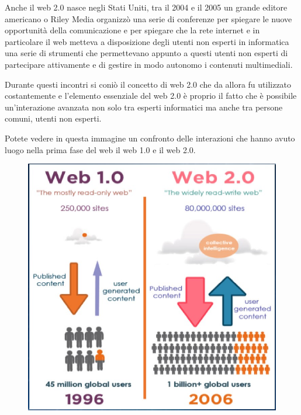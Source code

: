 Anche il web 2.0 nasce negli Stati Uniti, tra il 2004 e il 2005 un grande editore americano o Riley Media organizzò una serie di conferenze per spiegare le nuove opportunità della comunicazione e per spiegare che la rete internet e in particolare il web metteva a disposizione degli utenti non esperti in informatica una serie di strumenti che permettevano appunto a questi utenti non esperti di partecipare attivamente e di gestire in modo autonomo i contenuti multimediali. \par
Durante questi incontri si coniò il concetto di web 2.0 che da allora fu utilizzato costantemente e l'elemento essenziale del web 2.0 è proprio il fatto che è possibile un'interazione avanzata non solo tra esperti informatici ma anche tra persone comuni, utenti non esperti. \par
Potete vedere in questa immagine un confronto delle interazioni che hanno avuto luogo nella prima fase del web il web 1.0 e il web 2.0.

\begin{figure}[ht]
    \centering
    \includegraphics[width=0.75\linewidth]{images/06_lez_fig_01.jpg}
\end{figure}

